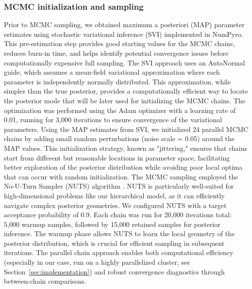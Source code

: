 \documentclass[12pt,a4paper]{article}
\begin{document}
\subsubsection{MCMC initialization and sampling}
Prior to MCMC sampling, we obtained maximum a posteriori (MAP) parameter estimates using stochastic variational inference (SVI) implemented in NumPyro. This pre-estimation step provides good starting values for the MCMC chains, reduces burn-in time, and helps identify potential convergence issues before computationally expensive full sampling.
The SVI approach uses an AutoNormal guide, which assumes a mean-field variational approximation where each parameter is independently normally distributed. This approximation, while simpler than the true posterior, provides a computationally efficient way to locate the posterior mode that will be later used for initializing the MCMC chains. The optimization was performed using the Adam optimizer with a learning rate of 0.01, running for 3,000 iterations to ensure convergence of the variational parameters.
Using the MAP estimates from SVI, we initialized 24 parallel MCMC chains by adding small random perturbations (noise scale = 0.05) around the MAP values. This initialization strategy, known as "jittering," ensures that chains start from different but reasonable locations in parameter space, facilitating better exploration of the posterior distribution while avoiding poor local optima that can occur with random initialization.
The MCMC sampling employed the No-U-Turn Sampler (NUTS) algorithm \citep{hoffman2014nuts}. NUTS is particularly well-suited for high-dimensional problems like our hierarchical model, as it can efficiently navigate complex posterior geometries. We configured NUTS with a target acceptance probability of 0.9.
Each chain was run for 20,000 iterations total: 5,000 warmup samples, followed by 15,000 retained samples for posterior inference. The warmup phase allows NUTS to learn the local geometry of the posterior distribution, which is crucial for efficient sampling in subsequent iterations. The parallel chain approach enables both computational efficiency (especially in our case, run on a highly parallelized cluster, see Section~\ref{sec:implementation}) and robust convergence diagnostics through between-chain comparisons.
\end{document}
